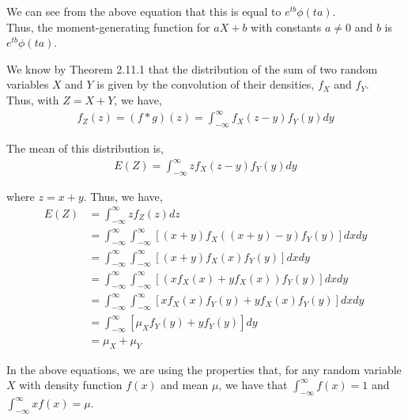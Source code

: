 \documentclass[12pt]{article}
\newenvironment{problem}[2][Problem]{\begin{trivlist}
\item[\hskip \labelsep {\bfseries #1}\hskip \labelsep {\bfseries #2.}]}{\end{trivlist}}
\begin{document}
We can see from the above equation that this is equal to $e^{tb}\phi(ta)$.\\

Thus, the moment-generating function for $aX + b$ with constants $a \neq 0$ and $b$ is $e^{tb}\phi(ta)$.

\begin{problem}{6}
\end{problem}

We know by Theorem 2.11.1 that the distribution of the sum of two random variables $X$ and $Y$ is given by the convolution of their densities, $f_X$ and $f_Y$.\\

Thus, with $Z = X + Y$, we have,
\begin{align*}
f_Z(z) = (f*g)(z) = \int_{-\infty}^{\infty} f_X(z-y)f_Y(y) dy
\end{align*}

The mean of this distribution is,
\begin{align*}
E(Z) = \int_{-\infty}^{\infty} zf_X(z-y)f_Y(y) dy
\end{align*}

where $z = x+y$. Thus, we have,
\begin{align*}
E(Z) &= \int_{-\infty}^{\infty} zf_Z(z) dz\\
&= \int_{-\infty}^{\infty} \int_{-\infty}^{\infty} \left[(x+y)f_X((x+y)-y)f_Y(y)\right] dxdy\\
&= \int_{-\infty}^{\infty} \int_{-\infty}^{\infty} \left[(x+y)f_X(x)f_Y(y)\right] dxdy\\
&= \int_{-\infty}^{\infty} \int_{-\infty}^{\infty} \left[(xf_X(x) + yf_X(x))f_Y(y)\right] dxdy\\
&= \int_{-\infty}^{\infty} \int_{-\infty}^{\infty} \left[xf_X(x)f_Y(y) + yf_X(x)f_Y(y)\right] dxdy\\
&= \int_{-\infty}^{\infty} \left[\mu_Xf_Y(y) + yf_Y(y)\right]dy\\
&= \mu_X + \mu_Y
\end{align*}

In the above equations, we are using the properties that, for any random variable $X$ with density function $f(x)$ and mean $\mu$, we have that $\int_{-\infty}^{\infty} f(x) = 1$ and  $\int_{-\infty}^{\infty} xf(x) = \mu$.\\
\end{document}
